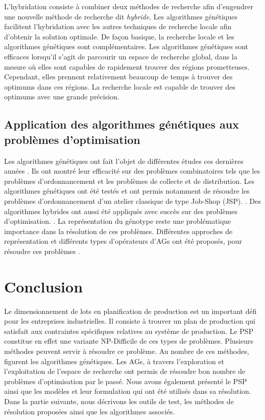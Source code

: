 	L'hybridation \cite{Goncalves} consiste à combiner deux méthodes de recherche afin d'engendrer une nouvelle méthode de recherche dit \emph{hybride}. Les algorithmes génétiques facilitent l'hybridation avec les autres techniques de recherche locale afin d'obtenir la solution optimale. De façon basique, la recherche locale et les algorithmes génétiques sont complémentaires. Les algorithmes génétiques sont efficaces lorsqu'il s'agit de parcourir un espace de recherche global, dans la mesure où elles sont capables de rapidement trouver des régions prometteuses. Cependant, elles prennent relativement beaucoup de temps à trouver des optimums dans ces régions. La recherche locale est capable de trouver des optimums avec une grande précision.
	
	\subsection{Application des algorithmes génétiques aux problèmes d'optimisation}
	
	Les algorithmes génétiques ont fait l'objet de différentes études ces dernières années \cite{jawahar}. Ils ont montré leur efficacité sur des problèmes combinatoires tels que les problèmes d’ordonnancement \cite{davis} et les problèmes de collecte et de distribution. Les algorithmes génétiques ont été testés et ont permis notamment de résoudre les problèmes d’ordonnancement d’un atelier classique de type Job-Shop (JSP). \cite{boukef}. Des algorithmes hybrides ont aussi été appliqués avec succès sur des problèmes d'optimisation. \cite{cavalieri}. La représentation du génotype reste une problématique importance dans la résolution de ces problèmes. Différentes approches de représentation et différents types d’opérateurs d’AGs ont été proposés, pour résoudre ces problèmes \cite{suer}.
	
	\section*{Conclusion}
	Le dimensionnement de lots en planification de production est un important défi pour les entreprises industrielles. Il consiste à trouver un plan de production qui satisfait aux contraintes spécifiques relatives au système de production. Le PSP constitue en effet une variante NP-Difficile de ces types de problèmes. Plusieurs méthodes peuvent servir à résoudre ce problème. Au nombre de ces méthodes, figurent les algorithmes génétiques. Les AGs, à travers l'exploration et l'exploitation de l'espace de recherche ont permis de résoudre bon nombre de problèmes d'optimisation par le passé. Nous avons également présenté le PSP ainsi que les modèles et leur formulation qui ont été utilisés dans sa résolution. Dans la partie suivante, nous décrivons les outils de test, les méthodes de résolution proposées ainsi que les algorithmes associés.
